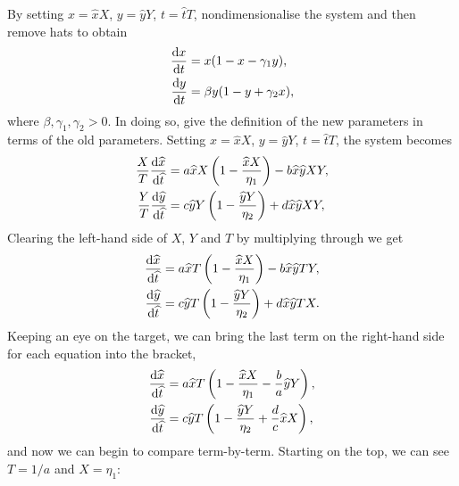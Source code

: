 \documentclass[a4paper,12pt]{article}
\begin{document}
\begin{enumerate}
	\question{}
	{ %
	By setting $x=\hat{x}X$, $y=\hat{y}Y$, $t=\hat{t}T$, nondimensionalise the system and then remove hats to obtain
	\begin{subequations}
    \begin{align}
    	\fd{x}{t} &= x(1-x - \gamma_1 y),\\
		\fd{y}{t} &= \beta y(1-y + \gamma_2 x),
    \end{align}
    \end{subequations}
    where $\beta, \gamma_1,\gamma_2 > 0$. In doing so, give the definition of the new parameters in terms of the old parameters.
    }
    { %
Setting $x=\hat{x}X$, $y=\hat{y}Y$, $t=\hat{t}T$, the system becomes
	\begin{subequations}
    \begin{align}
    	\frac{X}{T}\fd{\hat{x}}{\hat{t}} &= a\hat{x}X\left(1-\frac{\hat{x}X}{\eta_1}\right) - b\hat{x}\hat{y}XY,\\
		\frac{Y}{T}\fd{\hat{y}}{\hat{t}} &= c\hat{y}Y\left(1-\frac{\hat{y}Y}{\eta_2}\right) + d\hat{x}\hat{y}XY,
    \end{align}
    \end{subequations}
    Clearing the left-hand side of $X$, $Y$ and $T$ by multiplying through we get
	\begin{subequations}
    \begin{align}
    	\fd{\hat{x}}{\hat{t}} &= a\hat{x}T\left(1-\frac{\hat{x}X}{\eta_1}\right) - b\hat{x}\hat{y}TY,\\
		\fd{\hat{y}}{\hat{t}} &= c\hat{y}T\left(1-\frac{\hat{y}Y}{\eta_2}\right) + d\hat{x}\hat{y}TX.
    \end{align}
    \end{subequations}
    Keeping an eye on the target, we can bring the last term on the right-hand side for each equation into the bracket,
	\begin{subequations}
    \begin{align}
    	\fd{\hat{x}}{\hat{t}} &= a\hat{x}T\left(1-\frac{\hat{x}X}{\eta_1} - \frac{b}{a}\hat{y}Y\right),\label{minor-mistake}\\
		\fd{\hat{y}}{\hat{t}} &= c\hat{y}T\left(1-\frac{\hat{y}Y}{\eta_2} + \frac{d}{c}\hat{x}X\right),
    \end{align}
    \end{subequations}
    and now we can begin to compare term-by-term. Starting on the top, we can see $T=1/a$ and $X=\eta_1$:
	\begin{subequations}
    \begin{align}

\end{align}
\end{subequations}}
\end{enumerate}
\end{document}
